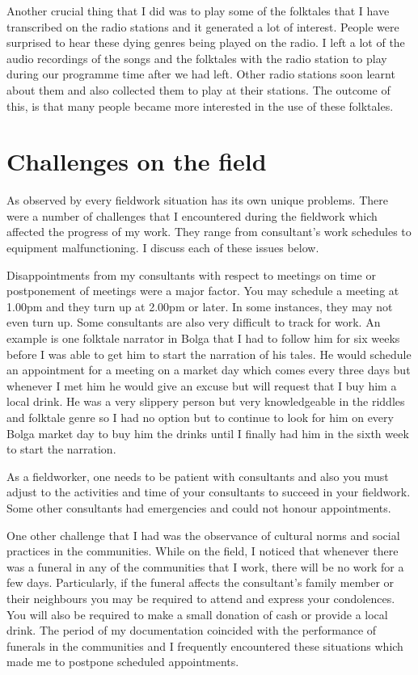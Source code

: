 \documentclass[output=paper,colorlinks,citecolor=brown]{langscibook}
\begin{document}
Another crucial thing that I did was to play some of the folktales that I have transcribed on the radio stations and it generated a lot of interest. People were surprised to hear these dying genres being played on the radio. I left a lot of the audio recordings of the songs and the folktales with the radio station to play during our programme time after we had left. Other radio stations soon learnt about them and also collected them to play at their stations. The outcome of this, is that many people became more interested in the use of these folktales.


\section{Challenges on the field}

As observed by \cite{Bowern2015} every fieldwork situation has its own unique problems. There were a number of challenges that I encountered during the fieldwork which affected the progress of my work. They range from consultant’s work schedules to equipment malfunctioning. I discuss each of these issues below.

Disappointments from my consultants with respect to meetings on time or postponement of meetings were a major factor. You may schedule a meeting at 1.00pm and they turn up at 2.00pm or later. In some instances, they may not even turn up. Some consultants are also very difficult to track for work. An example is one folktale narrator in Bolga that I had to follow him for six weeks before I was able to get him to start the narration of his tales. He would schedule an appointment for a meeting on a market day which comes every three days but whenever I met him he would give an excuse but will request that I buy him a local drink. He was a very slippery person but very knowledgeable in the riddles and folktale genre so I had no option but to continue to look for him on every Bolga market day to buy him the drinks until I finally had him in the sixth week to start the narration. 

As a fieldworker, one needs to be patient with consultants and also you must adjust to the activities and time of your consultants to succeed in your fieldwork. Some other consultants had emergencies and could not honour appointments.

One other challenge that I had was the observance of cultural norms and social practices in the communities. While on the field, I noticed that whenever there was a funeral in any of the communities that I work, there will be no work for a few days. Particularly, if the funeral affects the consultant’s family member or their neighbours you may be required to attend and express your condolences. You will also be required to make a small donation of cash or provide a local drink. The period of my documentation coincided with the performance of funerals in the communities and I frequently encountered these situations which made me to postpone scheduled appointments. 
\end{document}
